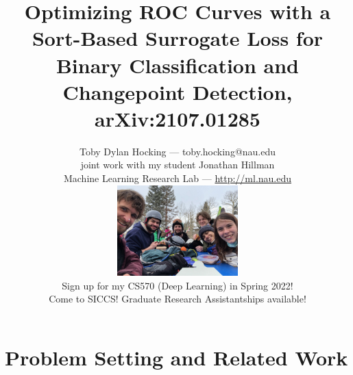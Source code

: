 \documentclass{beamer}
\begin{document}
\title{Optimizing ROC Curves with a Sort-Based Surrogate Loss for Binary Classification and Changepoint Detection, arXiv:2107.01285}

\author{
  Toby Dylan Hocking --- toby.hocking@nau.edu\\ 
  joint work with my student Jonathan Hillman\\
  Machine Learning Research Lab --- \url{http://ml.nau.edu}\\
  \includegraphics[height=3.5cm]{2021-03-lab-ski-lunch} \\
  Sign up for my CS570 (Deep Learning) in Spring 2022!\\
  Come to SICCS! Graduate Research Assistantships available!
}

\date{}

\maketitle 

\section{Problem Setting and Related Work}
\end{document}
